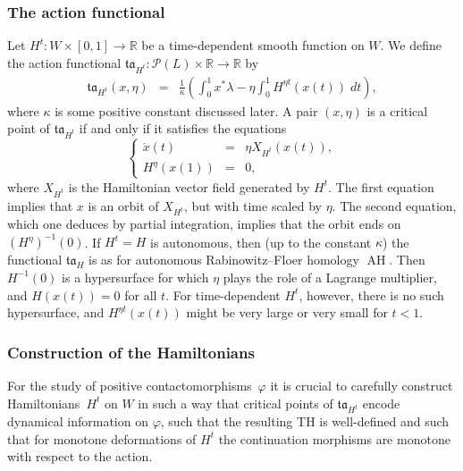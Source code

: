 \documentclass{amsart}
\newcommand{\Pcal}{{\mathcal{P}}}
\newcommand{\tacal}{{\mathfrak{ta}}}
\newcommand{\RR}{\mathbb{R}}
\newcommand{\AH}{\operatorname{AH}}
\theoremstyle{definition}
\theoremstyle{remark}
\numberwithin{equation}{section}
\begin{document}
\subsubsection*{The action functional}
Let $H^t:W\times [0,1]\to \RR$ be a time-dependent smooth function on $W$. We define the action functional $\tacal_{H^t}:\Pcal(L)\times \RR\to\RR$ by 
\begin{eqnarray}\label{functional}
	\tacal_{H^t}(x,\eta)&=&\frac1\kappa \left(\int_0^1x^*\lambda-\eta\int_0^1H^{\eta t}(x(t))\;dt\right),
\end{eqnarray}
where $\kappa$ is some positive constant discussed later. A pair $(x,\eta)$ is a critical point of $\tacal_{H^t}$ if and only if it satisfies the equations
\begin{equation*}\label{crit:lrfh}
\left\{\begin{array}{rcl}
		\dot x(t)&=&\eta X_{H^t}(x(t)),\\
		H^\eta(x(1))&=&0,
	\end{array}\right.
\end{equation*}
where $X_{H^t}$ is the Hamiltonian vector field generated by $H^t$.
The first equation implies that $x$ is an orbit of $X_{H^t}$, but with time scaled by $\eta$. The second equation, which one deduces by partial integration, implies that the orbit ends on $(H^{\eta})^{-1}(0)$. If $H^t=H$ is autonomous, then (up to the constant $\kappa$) the functional $\tacal_H$ is as for autonomous Rabinowitz--Floer homology $\AH$. Then $H^{-1}(0)$ is a hypersurface for which $\eta$ plays the role of a Lagrange multiplier, and $H(x(t))=0$ for all $t$. For time-dependent $H^t$, however, there is no such hypersurface, and $H^{\eta t}(x(t))$ might be very large or very small for $t<1$.

\subsubsection*{Construction of the Hamiltonians}
For the study of positive contactomorphisms~$\varphi$ it is crucial to carefully construct Hamiltonians~$H^t$ on $W$ in such a way that critical points of $\tacal_{H^t}$ encode dynamical information on $\varphi$, such that the resulting TH is well-defined and such that for monotone deformations of $H^t$ the continuation morphisms are monotone with respect to the action. 
\end{document}
